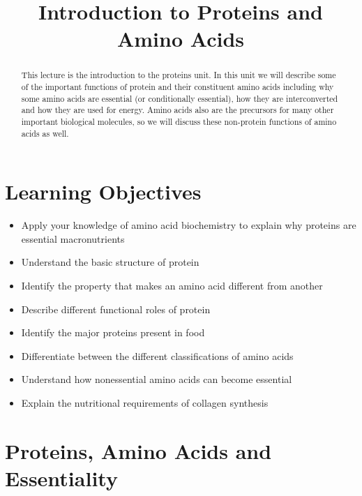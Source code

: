 \documentclass{tufte-handout}
\title{Introduction to Proteins and Amino Acids}
\author{}
\date{}  %
\begin{document}
\maketitle%

\begin{abstract}
\noindent This lecture is the introduction to the proteins unit.  In this unit we will describe some of the important functions of protein and their constituent amino acids including why some amino acids are essential (or conditionally essential), how they are interconverted and how they are used for energy.  Amino acids also are the precursors for many other important biological molecules, so we will discuss these non-protein functions of amino acids as well.
\end{abstract}

\tableofcontents

\pagebreak{}
\section{Learning Objectives}

\begin{itemize}
\item Apply your knowledge of amino acid biochemistry to explain why proteins are essential macronutrients
\item Understand the basic structure of protein
\item Identify the property that makes an amino acid different from another 
\item Describe different functional roles of protein
\item Identify the major proteins present in food
\item Differentiate between the different classifications of amino acids
\item Understand how nonessential amino acids can become essential
\item Explain the nutritional requirements of collagen synthesis


\end{itemize}

\section{Proteins, Amino Acids and Essentiality}
\end{document}
